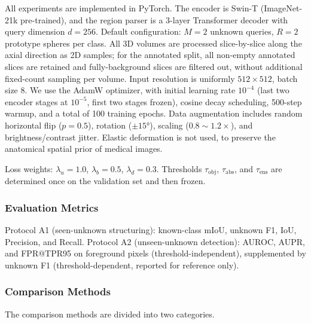 \documentclass[3p,twocolumn,authoryear]{elsarticle}
\newcommand{\tobj}{\tau_{\text{obj}}}                     %
\newcommand{\tabs}{\tau_{\text{abs}}}                     %
\newcommand{\tens}{\tau_{\text{ens}}}                     %
\begin{document}
All experiments are implemented in PyTorch.
The encoder is Swin-T (ImageNet-21k pre-trained), and the region parser is a
3-layer Transformer decoder with query dimension $d=256$.
Default configuration: $M=2$ unknown queries, $R=2$ prototype spheres per class.
All 3D volumes are processed slice-by-slice along the axial direction as 2D samples;
for the annotated split, all non-empty annotated slices are retained and
fully-background slices are filtered out, without additional fixed-count sampling per volume.
Input resolution is uniformly $512 \times 512$, batch size 8.
We use the AdamW optimizer, with initial learning rate $10^{-4}$ (last two encoder
stages at $10^{-5}$, first two stages frozen), cosine decay scheduling, 500-step warmup,
and a total of 100 training epochs.
Data augmentation includes random horizontal flip ($p=0.5$), rotation ($\pm 15°$),
scaling ($0.8 \sim 1.2\times$), and brightness/contrast jitter.
Elastic deformation is not used, to preserve the anatomical spatial prior of medical images.

Loss weights: $\lambda_u = 1.0$, $\lambda_b = 0.5$, $\lambda_d = 0.3$.
Thresholds $\tobj$, $\tabs$, and $\tens$ are determined once on the validation set
and then frozen.

\subsubsection{Evaluation Metrics}\label{sec:exp:setup:metric}

Protocol A1 (seen-unknown structuring):
known-class mIoU, unknown F1, IoU, Precision, and Recall.
Protocol A2 (unseen-unknown detection):
AUROC, AUPR, and FPR@TPR95 on foreground pixels (threshold-independent),
supplemented by unknown F1 (threshold-dependent, reported for reference only).

\subsubsection{Comparison Methods}\label{sec:exp:setup:baseline}

The comparison methods are divided into two categories.
\end{document}
